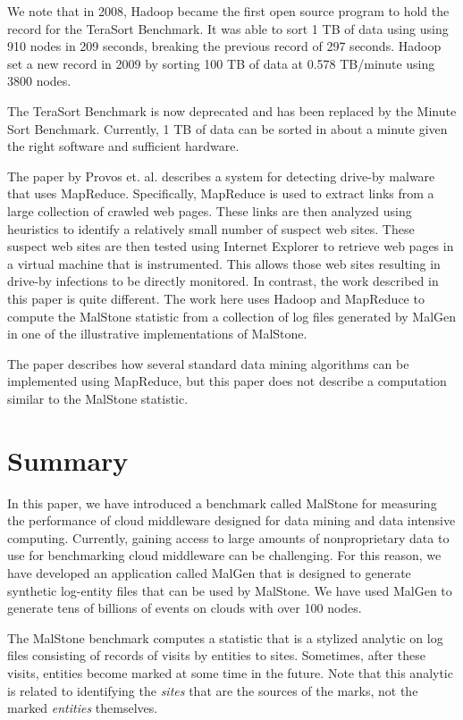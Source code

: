 \documentclass{acm_proc_article-sp}
\def\malstone{MalStone } \def\malgen{MalGen }
\def\malstonens{MalStone} \def\malgenns{MalGen}
\begin{document}
We note that in 2008, Hadoop became the first open source program to hold the
record for the TeraSort Benchmark. It was able to sort 1 TB of data
using using 910 nodes in 209 seconds, breaking the previous record of
297 seconds.  Hadoop set a new record in 2009 by sorting 100 TB of data
at 0.578 TB/minute using 3800 nodes. 

The TeraSort Benchmark is now deprecated and has been
replaced by the Minute Sort Benchmark. Currently, 1 TB of data can be
sorted in about a minute given the right software and sufficient
hardware.  

The paper by Provos et. al. \cite{Provos:2007} describes a system for
detecting drive-by malware that uses MapReduce.  Specifically,
MapReduce is used to extract links from a large collection of crawled
web pages.  These links are then analyzed using heuristics to identify
a relatively small number of suspect web sites.  These suspect web
sites are then tested using Internet Explorer to retrieve web pages in
a virtual machine that is instrumented.  This allows those web sites
resulting in drive-by infections to be directly monitored.  In
contrast, the work described in this paper is quite different.  The
work here uses Hadoop and MapReduce to compute the \malstone statistic
from a collection of log files generated by \malgen in one of the
illustrative implementations of \malstonens.

The paper \cite{Chu:2007} describes how several standard data mining
algorithms can be implemented using MapReduce, but this paper does not
describe a computation similar to the \malstone statistic.



\section{Summary}

In this paper, we have introduced a benchmark called \malstone for
measuring the performance of cloud middleware designed for data mining
and data intensive computing.  Currently, gaining access to large
amounts of nonproprietary data to use for benchmarking cloud
middleware can be challenging.  For this reason, we have developed an
application called \malgen that is designed to generate synthetic
log-entity files that can be used by \malstonens.  We have used \malgen
to generate tens of billions of events on clouds with over 100 nodes.

The \malstone benchmark computes a statistic that is a stylized analytic on log files consisting of records of visits by entities to sites.  Sometimes, after these visits, entities become marked at some time in the future.  Note that this analytic is related to identifying the {\em sites} that are the sources of the marks, not the marked {\em entities} themselves.
\end{document}
